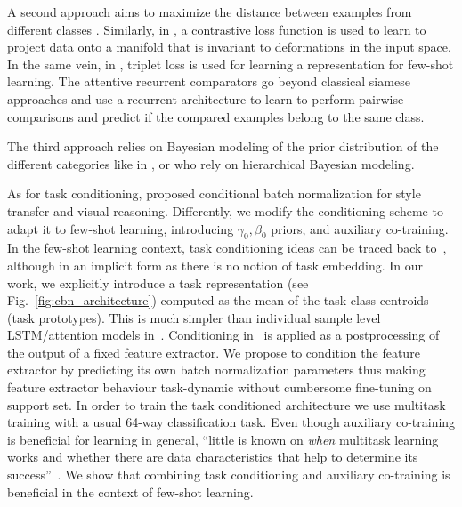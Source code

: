 \documentclass{article}
\begin{document}
A second approach aims to maximize the distance between examples from different classes \citep{koch2015siamese}. Similarly, in \citep{hadsell2006dimensionality}, a contrastive loss function is used to learn to project data onto a manifold that is invariant to deformations in the input space. In the same vein, in \citep{fink2005object, schroff2015facenet, taigman2015web}, triplet loss is used for learning a representation for few-shot learning. The attentive recurrent comparators \citep{shyam2017attentive} go beyond classical siamese approaches and use a recurrent architecture to learn to perform pairwise comparisons and predict if the compared examples belong to the same class.

The third approach relies on Bayesian modeling of the prior distribution of the different categories like in \citet{fei2006one, Bauer2017discriminative}, or \citet{lake2013one, edwards2016towards, Lacoste2018deepprior} who rely on hierarchical Bayesian modeling.

As for task conditioning, \cite{Dumoulin2017learned, Perez2017LearningVR, perez2017film} proposed conditional batch normalization for style transfer and visual reasoning. Differently, we modify the conditioning scheme to adapt it to few-shot learning, introducing $\gamma_0,\beta_0$ priors, and auxiliary co-training. In the few-shot learning context, task conditioning ideas can be traced back to~\citep{vinyals2016matching}, although in an implicit form as there is no notion of task embedding. In our work, we explicitly introduce a task representation (see Fig.~\ref{fig:cbn_architecture}) computed as the mean of the task class centroids (task prototypes). This is much simpler than individual sample level LSTM/attention models in~\citep{vinyals2016matching}. Conditioning in~\citep{vinyals2016matching} is applied as a postprocessing of the output of a fixed feature extractor. We propose to condition the feature extractor by predicting its own batch normalization parameters thus making feature extractor behaviour task-dynamic without cumbersome fine-tuning on support set. In order to train the task conditioned architecture we use multitask training with a usual 64-way classification task. Even though auxiliary co-training is beneficial for learning in general, ``little is known on \emph{when} multitask learning works and whether there are data characteristics that help to determine its success''~\citep{plank2017when}. We show that combining task conditioning and auxiliary co-training is beneficial in the context of few-shot learning.
\end{document}
